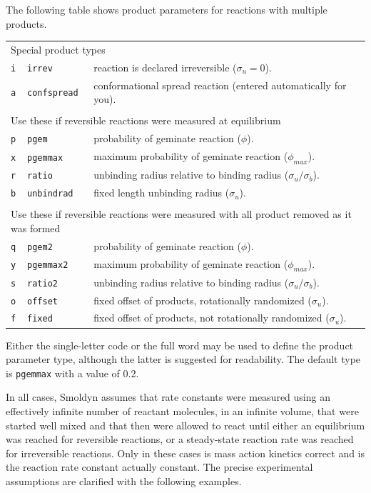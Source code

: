 \documentclass {book}
\newcommand {\ttt} {\texttt}
\begin{document}
The following table shows product parameters for reactions with multiple products.

\begin{longtable}[c]{lll}
\multicolumn{3}{l}{Special product types}\\
\ttt{i} & \ttt{irrev} & reaction is declared irreversible ($\sigma_u=0$).\\
\ttt{a} & \ttt{confspread} & conformational spread reaction (entered automatically for you).\\ \\
\multicolumn{3}{l}{Use these if reversible reactions were measured at equilibrium}\\
\ttt{p} & \ttt{pgem} & probability of geminate reaction ($\phi$).\\
\ttt{x} & \ttt{pgemmax} & maximum probability of geminate reaction ($\phi_{max}$).\\
\ttt{r} & \ttt{ratio} & unbinding radius relative to binding radius ($\sigma_u/\sigma_b$).\\
\ttt{b} & \ttt{unbindrad} & fixed length unbinding radius ($\sigma_u$).\\ \\
\multicolumn{3}{l}{Use these if reversible reactions were measured with all product removed as it was formed}\\
\ttt{q} & \ttt{pgem2} & probability of geminate reaction ($\phi$).\\
\ttt{y} & \ttt{pgemmax2} & maximum probability of geminate reaction ($\phi_{max}$).\\
\ttt{s} & \ttt{ratio2} & unbinding radius relative to binding radius ($\sigma_u/\sigma_b$).\\
\ttt{o} & \ttt{offset} & fixed offset of products, rotationally randomized ($\sigma_u$).\\
\ttt{f} & \ttt{fixed} & fixed offset of products, not rotationally randomized ($\sigma_u$).
\end{longtable}

Either the single-letter code or the full word may be used to define the product parameter type, although the latter is suggested for readability. The default type is \ttt{pgemmax} with a value of 0.2.

In all cases, Smoldyn assumes that rate constants were measured using an effectively infinite number of reactant molecules, in an infinite volume, that were started well mixed and that then were allowed to react until either an equilibrium was reached for reversible reactions, or a steady-state reaction rate was reached for irreversible reactions. Only in these cases is mass action kinetics correct and is the reaction rate constant actually constant. The precise experimental assumptions are clarified with the following examples.
\end{document}
